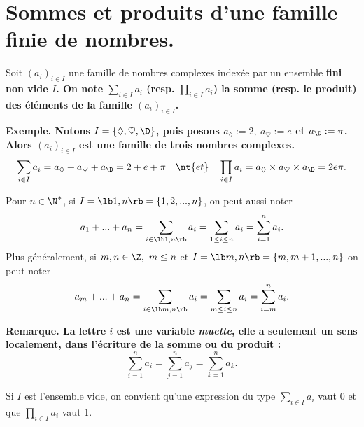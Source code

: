 \documentclass[11pt]{article}
\begin{document}


\thispagestyle{fancy}

\section{Sommes et produits d'une famille finie de nombres.}

\begin{nota}{}{}
    Soit $(a_i)_{i\in I}$ une famille de nombres complexes indexée par un ensemble \bf{fini non vide} $I$.\n
    On note $\sum\limits_{i\in I}a_i$ (resp. $\prod\limits_{i\in I}a_i$) la somme (resp. le produit) des éléments de la famille $(a_i)_{i\in I}$.
\end{nota}

\bf{Exemple.} Notons $I=\{\lozenge,\heartsuit,\D\}$, puis posons $a_\lozenge:=2,~a_{\heartsuit}:=e$ et $a_\D:=\pi$.\\
Alors $(a_i)_{i\in I}$ est une famille de trois nombres complexes.
\begin{equation*}
    \sum_{i\in I}a_i=a_{\lozenge}+a_{\heartsuit}+a_\D=2+e+\pi\quad\nt{et}\quad\prod_{i\in I}a_i=a_{\lozenge}\times a_{\heartsuit} \times a_{\D}=2e\pi.
\end{equation*}

\begin{nota}{}{}
    Pour $n\in\N^*$, si $I=\lb1,n\rb=\{1,2,...,n\}$, on peut aussi noter
    \begin{equation*}
        a_1+...+a_n=\sum_{i\in\lb1,n\rb}a_i=\sum_{1\leq i\leq n}a_i=\sum_{i=1}^na_i.
    \end{equation*}
    Plus généralement, si $m,n\in\Z,~m\leq n$ et $I=\lb m,n \rb = \{m,m+1,...,n\}$ on peut noter
    \begin{equation*}
        a_m+...+a_n=\sum_{i\in\lb m,n\rb}a_i=\sum_{m\leq i\leq n}a_i = \sum_{i=m}^na_i.
    \end{equation*}
\end{nota}

\bf{Remarque.} La lettre $i$ est une variable \emph{muette}, elle a seulement un sens localement, dans l'écriture de la somme ou du produit :
\begin{equation*}
    \sum_{i=1}^na_i=\sum_{j=1}^na_j=\sum_{k=1}^na_k.
\end{equation*}

\begin{nota}{}{}
    Si $I$ est l'ensemble vide, on convient qu'une expression du type $\sum\limits_{i\in I}a_i$ vaut 0 et que $\prod\limits_{i\in I}a_i$ vaut 1.
\end{nota}
\end{document}
